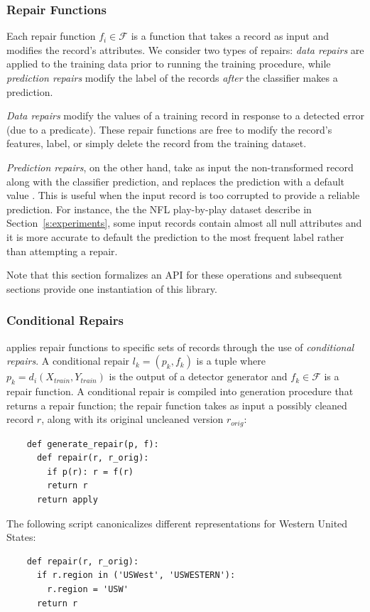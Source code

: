 \subsubsection{Repair Functions}
Each repair function $f_i \in \mathcal{F}$ is a function that takes a record as input and modifies the record's attributes.  We consider two types of repairs:  {\it data repairs} are applied to the training data prior to running the training procedure, while {\it prediction repairs} modify the label of the records {\it after} the classifier makes a prediction.   

{\it Data repairs} modify the values of a training record in response to a detected error (due to a predicate).  These repair functions are free to modify the record's features, label, or simply delete the record from the training dataset.  

{\it Prediction repairs}, on the other hand, take as input the non-transformed record along with the classifier prediction, and replaces the prediction with a default value .  This is useful when the input record is too corrupted to provide a reliable prediction.  For instance, the the NFL play-by-play dataset describe in Section~\ref{s:experiments}, some input records contain almost all null attributes and it is more accurate to default the prediction to the most frequent label rather than attempting a repair.

Note that this section formalizes an API for these operations and subsequent sections provide one instantiation of this library.

\subsubsection{Conditional Repairs}
\sys applies repair functions to specific sets of records through the use of {\it conditional repairs}.  A conditional repair $l_k = (p_k, f_k)$ is a tuple where $p_k = d_i(X_{train}, Y_{train})$ is the output of a detector generator and $f_k \in \mathcal{F}$ is a repair function.
A conditional repair is compiled into generation procedure that returns a repair function; the repair function takes as input a possibly cleaned record $r$, along with its original uncleaned version $r_{orig}$:
{\small\begin{verbatim}
    def generate_repair(p, f):
      def repair(r, r_orig):
        if p(r): r = f(r)   
        return r 
      return apply
\end{verbatim}}

\begin{example}\sloppy
The following script canonicalizes different representations for Western United States:
{\small\begin{verbatim}
    def repair(r, r_orig):
      if r.region in ('USWest', 'USWESTERN'):
        r.region = 'USW'
      return r
\end{verbatim}}
\end{example}

